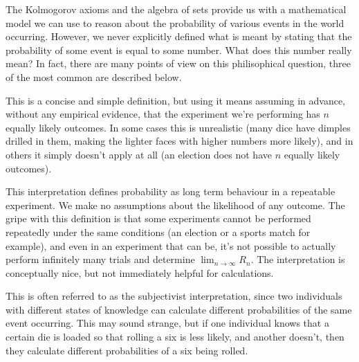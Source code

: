 The Kolmogorov axioms and the algebra of sets provide us with a mathematical model we can use to reason about the probability of various events in the world occurring. However, we never explicitly defined what is meant by stating that the probability of some event is equal to some number. What does this number really mean? In fact, there are many points of view on this philisophical question, three of the most common are described below.
\par
{}
\par
This is a concise and simple definition, but using it means assuming in advance, without any empirical evidence, that the experiment we're performing has $n$ equally likely outcomes. In some cases this is unrealistic (many dice have dimples drilled in them, making the lighter faces with higher numbers more likely), and in others it simply doesn't apply at all (an election does not have $n$ equally likely outcomes).
\par
{}
\par
This interpretation defines probability as long term behaviour in a repeatable experiment. We make no assumptions about the likelihood of any outcome. The gripe with this definition is that some experiments cannot be performed repeatedly under the same conditions (an election or a sports match for example), and even in an experiment that can be, it's not possible to actually perform infinitely many trials and determine $\lim_{n \to \infty} R_n$. The interpretation is conceptually nice, but not immediately helpful for calculations.
\par
{}
\par
This is often referred to as the subjectivist interpretation, since two individuals with different states of knowledge can calculate different probabilities of the same event occurring. This may sound strange, but if one individual knows that a certain die is loaded so that rolling a six is less likely, and another doesn't, then they  calculate different probabilities of a six being rolled. 
